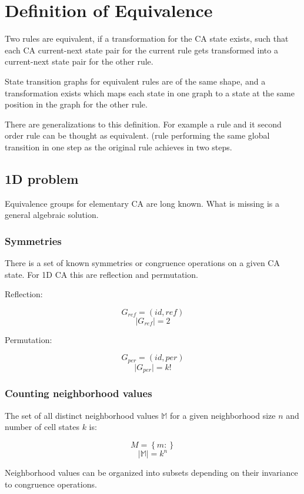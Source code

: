 \documentclass{ijuc}
\begin{document}
\section{Definition of Equivalence}

Two rules are equivalent, if a transformation for the CA state exists, such that each CA
current-next state pair for the current rule gets transformed into a current-next state pair
for the other rule.

State transition graphs for equivalent rules are of the same shape, and a transformation exists
which maps each state in one graph to a state at the same position in the graph for the other rule.

There are generalizations to this definition. For example a rule and it second order rule can be thought as equivalent.
(rule performing the same global transition in one step as the original rule achieves in two steps.

\subsection{1D problem}

Equivalence groups for elementary CA are long known. What is missing is a general algebraic solution.

\subsubsection{Symmetries}

There is a set of known symmetries or congruence operations on a given CA state.
For 1D CA this are reflection and permutation.

Reflection:

\[ G_{ref} = (id, ref) \]
\[ \vert G_{ref} \vert = 2 \]

Permutation:

\[ G_{per} = (id, per) \]
\[ \vert G_{per} \vert = k! \]

\subsubsection{Counting neighborhood values}

The set of all distinct neighborhood values $\mathbb{M}$ for a given neighborhood size $n$ and
number of cell states $k$ is:

\[ M = \left\{ m : \right\} \]
\[ \vert \mathbb{M} \vert = k^n \]

Neighborhood values can be organized into subsets depending on their invariance to congruence operations.
\end{document}
